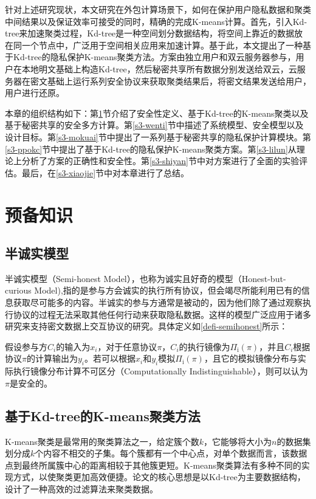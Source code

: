 针对上述研究现状，本文研究在外包计算场景下，如何在保护用户隐私数据和聚类中间结果以及保证效率可接受的同时，精确的完成K-means计算。首先，引入Kd-tree来加速聚类过程，Kd-tree是一种空间划分数据结构，将空间上靠近的数据放在同一个节点中，广泛用于空间相关应用来加速计算。基于此，本文提出了一种基于Kd-tree的隐私保护K-means聚类方法。方案由独立用户和双云服务器参与，用户在本地明文基础上构造Kd-tree，然后秘密共享所有数据分别发送给双云，云服务器在密文基础上运行系列安全协议来获取聚类结果后，将密文结果发送给用户，用户进行还原。

本章的组织结构如下：第\ref{s3-yubei}节介绍了安全性定义、基于Kd-tree的K-means聚类以及基于秘密共享的安全多方计算。第\ref{s3-wenti}节中描述了系统模型、安全模型以及设计目标。第\ref{s3-mokuai}节中提出了一系列基于秘密共享的隐私保护计算模块。第\ref{s3-ppokc}节中提出了基于Kd-tree的隐私保护K-means聚类方案。第\ref{s3-lilun}从理论上分析了方案的正确性和安全性。第\ref{s3-shiyan}节中对方案进行了全面的实验评估。最后，在\ref{s3-xiaojie}节中对本章进行了总结。
\section{预备知识}
\label{s3-yubei}
\subsection{半诚实模型}
半诚实模型（Semi-honest Model），也称为诚实且好奇的模型（Honest-but-curious Model),指的是参与方会诚实的执行所有协议，但会竭尽所能利用已有的信息获取尽可能多的内容。半诚实的参与方通常是被动的，因为他们除了通过观察执行协议的过程无法采取其他任何行动来获取隐私数据。这样的模型广泛应用于诸多研究来支持密文数据上交互协议的研究。具体定义\cite{oded2009foundations}如\ref{defi-semihonest}所示：

\begin{definition}
	\label{defi-semihonest}
	假设参与方$ C_i $的输入为$ x_i $，对于任意协议$ \pi $，$ C_i $的执行镜像为$\Pi_{\mathrm{i}}(\pi)$，并且$ C_i $根据协议$ \pi $的计算输出为$ y_i$。若可以根据$ x_i $和$ y_i $模拟$\Pi_{\mathrm{i}}(\pi)$，且它的模拟镜像分布与实际执行镜像分布计算不可区分（Computationally Indistinguishable），则可以认为$ \pi $是安全的。
\end{definition}

\subsection{基于Kd-tree的K-means聚类方法}
K-means聚类是最常用的聚类算法之一，给定簇个数$ k $，它能够将大小为$ n $的数据集划分成$ k $个内容不相交的子集。每个簇都有一个中心点，对单个数据而言，该数据点到最终所属簇中心的距离相较于其他簇更短。K-means聚类算法有多种不同的实现方式，以使聚类更加高效便捷。论文\cite{kanungo2002efficient}的核心思想是以Kd-tree为主要数据结构，设计了一种高效的过滤算法来聚类数据。

